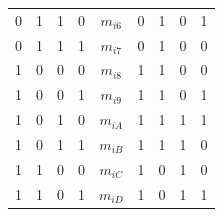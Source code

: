 \documentclass[a4paper]{article}
\begin{document}
\begin{table}[H]
\begin{tabular}{|c|c|c|c|c|c|c|c|c|}
0                                  & 1                                 & 1                                 & 0            & \textbf{$m_{i6}$} & 0                                   & 1                                   & 0                                   & 1                                   \\ \cline{5-5}
0                                  & 1                                 & 1                                 & 1            & \textbf{$m_{i7}$} & 0                                   & 1                                   & 0                                   & 0                                   \\ \cline{5-5}
1                                  & 0                                 & 0                                 & 0            & \textbf{$m_{i8}$} & 1                                   & 1                                   & 0                                   & 0                                   \\ \cline{5-5}
1                                  & 0                                 & 0                                 & 1            & \textbf{$m_{i9}$} & 1                                   & 1                                   & 0                                   & 1                                   \\ \cline{5-5}
1                                  & 0                                 & 1                                 & 0            & \textbf{$m_{iA}$} & 1                                   & 1                                   & 1                                   & 1                                   \\ \cline{5-5}
1                                  & 0                                 & 1                                 & 1            & \textbf{$m_{iB}$} & 1                                   & 1                                   & 1                                   & 0                                   \\ \cline{5-5}
1                                  & 1                                 & 0                                 & 0            & \textbf{$m_{iC}$} & 1                                   & 0                                   & 1                                   & 0                                   \\ \cline{5-5}
1                                  & 1                                 & 0                                 & 1            & \textbf{$m_{iD}$} & 1                                   & 0                                   & 1                                   & 1                                   \\ \cline{5-5}

\end{tabular}
\end{table}
\end{document}

